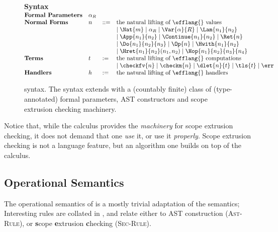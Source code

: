 \begin{figure}
\begin{core-desc}
  {\large \textbf{Syntax}} \\

  $\begin{array}{@{}llll}
    \textbf{Formal Parameters} & \alpha_R \\
    \textbf{Normal Forms} & n & ::= & \text{the natural lifting of \efflang{} values} \\
    &&& \mid  \Nat{m} \mid \alpha_R \mid \Var{\alpha}{R} \mid \Lam{n_1}{n_2}  \\ 
  &&&\mid \App{n_1}{n_2} \mid \Continue{n_1}{n_2} \mid \Ret{n}   \\ 
  &&& \mid \Do{n_1}{n_2}{n_3} \mid \Op{n} \mid \Hwith{n_1}{n_2}   \\
  &&&\mid \Hret{n_1}{n_2}(n_1, n_2) \mid \Hop{n_1}{n_2}{n_3}{n_4} \\
  \textbf{Terms} & t & := & \text{the natural lifting of \efflang{} computations} \\
  &&& \mid \checkfv{n} \mid \checkm{n} \mid \dlet{n}{t} \mid \tls{t} \mid \err \\
  \textbf{Handlers} & h & := & \text{the natural lifting of \efflang{} handlers} \\
  \end{array}$
\end{core-desc}
\caption{\coreLang{} syntax. The syntax extends \efflang{} with a (countably finite) class of (type-annotated) formal parameters, AST constructors and scope extrusion checking machinery.}
\label{fig:core-syntax}
\end{figure}

Notice that, while the calculus provides the \textit{machinery} for scope extrusion checking, it does not demand that one \textit{use} it, or use it \textit{properly}. Scope extrusion checking is not a language feature, but an algorithm one builds on top of the calculus. 
\subsection{Operational Semantics}
The operational semantics of \coreLang{} is a mostly trivial adaptation of the \efflang{} semantics; Interesting rules are collated in , and relate either to AST construction (\textsc{Ast-Rule}), or \textbf{s}cope \textbf{e}xtrusion \textbf{c}hecking (\textsc{Sec-Rule}).

\newcommand{\coreConfiguration}[5]{\langle {#1}; {#2}; {#3}; {#4}; {#5} \rangle}
  \newcommand{\astRule}[1]{\rulename{Ast}{#1}}
  \newcommand{\secRule}[1]{\rulename{Sec}{#1}}

